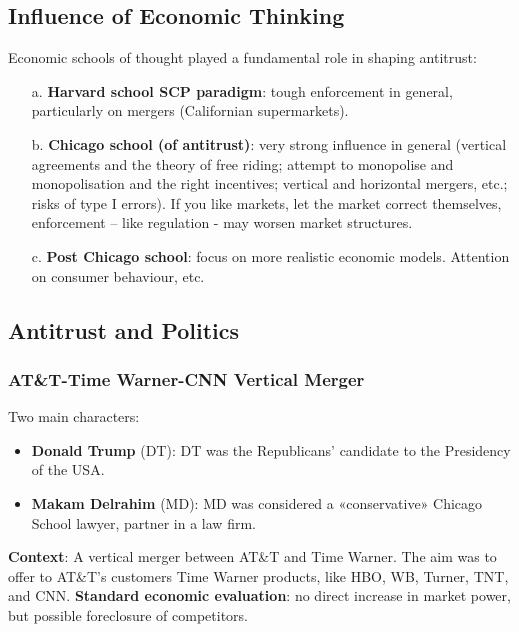         
    \subsection{Influence of Economic Thinking}

        Economic schools of thought played a fundamental role in shaping antitrust: 
        \begin{itemize}
            \item[a.] \textbf{Harvard school SCP paradigm}: tough enforcement in general, particularly on mergers (Californian supermarkets).
            \item[b.] \textbf{Chicago school (of antitrust)}: very strong influence in general (vertical agreements and the theory of free riding;  attempt to monopolise and monopolisation and the right incentives; vertical and horizontal mergers, etc.; risks of type I errors). If you like markets, let the market correct themselves, enforcement – like regulation - may worsen market structures.
            \item[c.] \textbf{Post Chicago school}: focus on more realistic economic models. Attention on consumer behaviour, etc. 
        \end{itemize}


    \subsection{Antitrust and Politics}

        \subsubsection{AT\&T-Time Warner-CNN Vertical Merger}

            Two main characters:
                \begin{itemize}
                    \item \textbf{Donald Trump} (DT): DT was the Republicans’ candidate to the Presidency of the USA.
                    \item \textbf{Makam Delrahim} (MD): MD was considered a «conservative» Chicago School lawyer, partner in a law firm.  
                \end{itemize}

            \textbf{Context}: A vertical merger between AT\&T and Time Warner. The aim was to offer to AT\&T’s customers Time Warner products, like HBO, WB, Turner, TNT, and CNN. 
            \textbf{Standard economic evaluation}: no direct increase in market power, but possible foreclosure of competitors.

